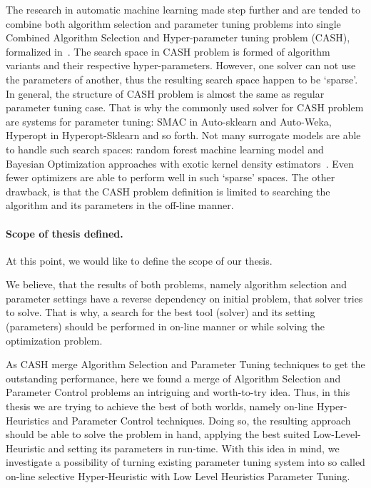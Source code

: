 The research in automatic machine learning made step further and are tended to combine both algorithm selection and parameter tuning problems into single Combined Algorithm Selection and Hyper-parameter tuning problem (CASH), formalized in~\cite{thornton2013auto}. The search space in CASH problem is formed of algorithm variants and their respective hyper-parameters. However, one solver can not use the parameters of another, thus the resulting search space happen to be `sparse'. In general, the structure of CASH problem is almost the same as regular parameter tuning case. That is why the commonly used solver for CASH problem are systems for parameter tuning: SMAC in Auto-sklearn and Auto-Weka, Hyperopt in Hyperopt-Sklearn and so forth.
Not many surrogate models are able to handle such search spaces: random forest machine learning model and Bayesian Optimization approaches with exotic kernel density estimators~\cite{levesque2017bayesian}. Even fewer optimizers are able to perform well in such `sparse' spaces.
The other drawback, is that the CASH problem definition is limited to searching the algorithm and its parameters in the off-line manner.

\paragraph{Scope of thesis defined.}
At this point, we would like to define the scope of our thesis.

We believe, that the results of both problems, namely algorithm selection and parameter settings have a reverse dependency on initial problem, that solver tries to solve.
That is why, a search for the best tool (solver) and its setting (parameters) should be performed in on-line manner or while solving the optimization problem.

As CASH merge Algorithm Selection and Parameter Tuning techniques to get the outstanding performance, here we found a merge of Algorithm Selection and Parameter Control problems an intriguing and worth-to-try idea. 
Thus, in this thesis we are trying to achieve the best of both worlds, namely on-line Hyper-Heuristics and Parameter Control techniques. Doing so, the resulting approach should be able to solve the problem in hand, applying the best suited Low-Level-Heuristic and setting its parameters in run-time. With this idea in mind, we investigate a possibility of turning existing parameter tuning system into so called on-line selective Hyper-Heuristic with Low Level Heuristics Parameter Tuning.
